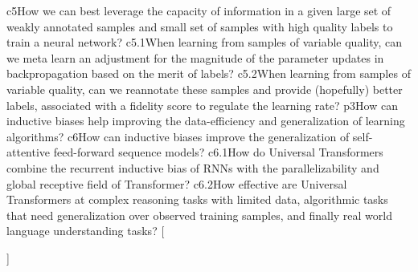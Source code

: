 {{    {c5}{How we can best leverage the capacity of information in a given large set of weakly annotated samples and small set of samples with high quality labels to train a neural network?}%
    {c5.1}{When learning from samples of variable quality, can we meta learn an adjustment for the magnitude of the parameter updates in backpropagation based on the merit of labels?}
    {c5.2}{When learning from samples of variable quality, can we reannotate these samples and provide (hopefully) better labels, associated with a fidelity score to regulate the learning rate?}
    {p3}{How can inductive biases help improving the data-efficiency and generalization of learning algorithms?}
    {c6}{How can inductive biases improve the generalization of self-attentive feed-forward sequence models?}
    {c6.1}{How do Universal Transformers combine the recurrent inductive bias of RNNs with the parallelizability and global receptive field of Transformer?}
    {c6.2}{How effective are Universal Transformers at complex reasoning tasks with limited data, algorithmic tasks that need generalization over observed training samples, and finally real world language understanding tasks?}
    }[\PackageError{rq}{Undefined option to rq: #1}{}]%
}%

\newcommand{\resqname}[1]{%
    \IfEqCase{#1}{%
    {main}{RQ-Main}
    {p1}{RQ-1}
    {c2}{RQ-1.1}
    {c2.1}{RQ-1.1.1}
    {c2.2}{RQ-1.1.2}
    {c2.3}{RQ-1.1.3}
    {c3}{RQ-1.2}
    {c3.1}{RQ-1.2.1}
    {c3.2}{RQ-1.2.2}
    {c3.3}{RQ-1.2.3}
    {p2}{RQ-2}
    {c4}{RQ-2.1}%
    {c4.1}{RQ-2.1.1}
    {c4.2}{RQ-2.1.2}
    {c4.3}{RQ-2.1.3}
    {c5}{RQ-2.2}%
    {c5.1}{RQ-2.2.1}
    {c5.2}{RQ-2.2.2}
    {p3}{RQ-3}
    {c6}{RQ-3.1}%
    {c6.1}{RQ-3.1.1}
    {c6.2}{RQ-3.1.2}
    }[\PackageError{rq}{Undefined option to rq: #1}{}]%
}%

\newcommand{\resq}[1]{%
    \begin{resqbox}
        \begin{enumerate}
            \item[\textbf{\resqname{#1}}] \emph{\resqcontent{#1}}
        \end{enumerate}
    \end{resqbox}
}%






